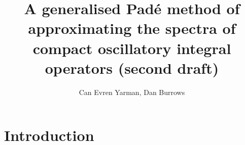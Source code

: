 \documentclass[11pt, a4paper]{article}
\title{A generalised Pad\'e method of approximating the spectra of compact oscillatory integral operators (second draft)}
\author{Can Evren Yarman, Dan Burrows}
\numberwithin{equation}{section}
\begin{document}
\maketitle

\section{Introduction}

\end{document}
